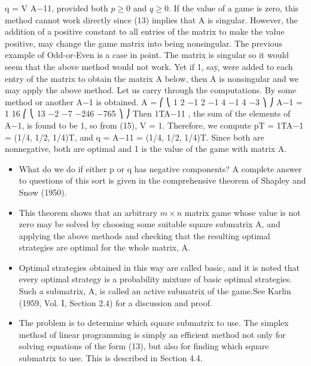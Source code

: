 \documentclass[]{report}
\begin{document}
q = V A−11, provided both $p \geq 0$ and $q \geq 0$.
If the value of a game is zero, this method cannot work directly since (13) implies
that A is singular. However, the addition of a positive constant to all entries of the matrix
to make the value positive, may change the game matrix into being nonsingular. The
previous example of Odd-or-Even is a case in point. The matrix is singular so it would
seem that the above method would not work. Yet if 1, say, were added to each entry of
the matrix to obtain the matrix A below, then A is nonsingular and we may apply the
above method. Let us carry through the computations. By some method or another A−1
is obtained.
A =
⎛
⎝
1 2 −1
2 −1 4
−1 4 −3
⎞
⎠ A−1 = 1
16
⎛
⎝
13 −2 −7
−246
−765
⎞
⎠
Then 1TA−11 , the sum of the elements of A−1, is found to be 1, so from (15), V = 1.
Therefore, we compute pT = 1TA−1 = (1/4, 1/2, 1/4)T, and q = A−11 = (1/4, 1/2, 1/4)T.
Since both are nonnegative, both are optimal and 1 is the value of the game with matrix
A.
\begin{itemize}
\item What do we do if either p or q has negative components? A complete answer to
questions of this sort is given in the comprehensive theorem of Shapley and Snow (1950).
\item This theorem shows that an arbitrary $m \times n$ matrix game whose value is not zero may be
solved by choosing some suitable square submatrix A, and applying the above methods
and checking that the resulting optimal strategies are optimal for the whole matrix, A.
\item Optimal strategies obtained in this way are called basic, and it is noted that every optimal
strategy is a probability mixture of basic optimal strategies. Such a submatrix, A, is called
an active submatrix of the game.See Karlin (1959, Vol. I, Section 2.4) for a discussion and
proof.
\item  The problem is to determine which square submatrix to use. The simplex method
of linear programming is simply an efficient method not only for solving equations of the
form (13), but also for finding which square submatrix to use. This is described in Section
4.4.
\end{itemize}
\end{document}
